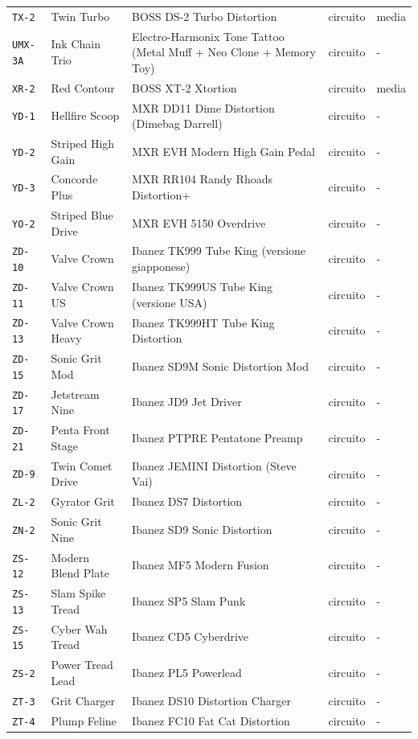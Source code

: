 \begin{xltabular}{\linewidth}{@{}l l X l l@{}}
\texttt{TX-2} & Twin Turbo & BOSS DS-2 Turbo Distortion & circuito & media\\
\texttt{UMX-3A} & Ink Chain Trio & Electro-Harmonix Tone Tattoo (Metal Muff + Neo Clone + Memory Toy) & circuito & -\\
\texttt{XR-2} & Red Contour & BOSS XT-2 Xtortion & circuito & media\\
\texttt{YD-1} & Hellfire Scoop & MXR DD11 Dime Distortion (Dimebag Darrell) & circuito & -\\
\texttt{YD-2} & Striped High Gain & MXR EVH Modern High Gain Pedal & circuito & -\\
\texttt{YD-3} & Concorde Plus & MXR RR104 Randy Rhoads Distortion+ & circuito & -\\
\texttt{YO-2} & Striped Blue Drive & MXR EVH 5150 Overdrive & circuito & -\\
\texttt{ZD-10} & Valve Crown & Ibanez TK999 Tube King (versione giapponese) & circuito & -\\
\texttt{ZD-11} & Valve Crown US & Ibanez TK999US Tube King (versione USA) & circuito & -\\
\texttt{ZD-13} & Valve Crown Heavy & Ibanez TK999HT Tube King Distortion & circuito & -\\
\texttt{ZD-15} & Sonic Grit Mod & Ibanez SD9M Sonic Distortion Mod & circuito & -\\
\texttt{ZD-17} & Jetstream Nine & Ibanez JD9 Jet Driver & circuito & -\\
\texttt{ZD-21} & Penta Front Stage & Ibanez PTPRE Pentatone Preamp & circuito & -\\
\texttt{ZD-9} & Twin Comet Drive & Ibanez JEMINI Distortion (Steve Vai) & circuito & -\\
\texttt{ZL-2} & Gyrator Grit & Ibanez DS7 Distortion & circuito & -\\
\texttt{ZN-2} & Sonic Grit Nine & Ibanez SD9 Sonic Distortion & circuito & -\\
\texttt{ZS-12} & Modern Blend Plate & Ibanez MF5 Modern Fusion & circuito & -\\
\texttt{ZS-13} & Slam Spike Tread & Ibanez SP5 Slam Punk & circuito & -\\
\texttt{ZS-15} & Cyber Wah Tread & Ibanez CD5 Cyberdrive & circuito & -\\
\texttt{ZS-2} & Power Tread Lead & Ibanez PL5 Powerlead & circuito & -\\
\texttt{ZT-3} & Grit Charger & Ibanez DS10 Distortion Charger & circuito & -\\
\texttt{ZT-4} & Plump Feline & Ibanez FC10 Fat Cat Distortion & circuito & -\\

\end{xltabular}
